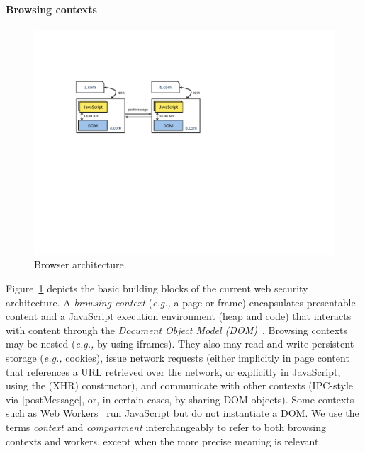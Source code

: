 \paragraph{Browsing contexts}
\iffigures
\begin{figure}
\begin{center}
\includegraphics[width=\columnwidth]{arch.pdf}
\end{center}
\vspace{-10pt}
\caption{\label{fig:primer-browser-arch} Browser
architecture.}
\vspace{-5pt}
\end{figure}
Figure~\ref{fig:primer-browser-arch} depicts the basic building blocks of
the current web security architecture.
%
%
A \emph{browsing context} (\emph{e.g.,} a page or frame) encapsulates
presentable content and a JavaScript execution environment (heap and
code) that interacts with content through the \emph{Document Object
  Model (DOM)}~\cite{html5}.
%
Browsing contexts may be nested (\emph{e.g.,} by using iframes).
%
They also may read and write persistent storage (\emph{e.g.,} cookies), issue
network requests (either implicitly in page content that references a
URL retrieved over the network, or explicitly in JavaScript, using the
\xhr{} (XHR) constructor), and communicate with other contexts
(IPC-style via \js|postMessage|, or, in certain cases, by sharing
DOM objects).
%
Some contexts such as Web Workers~\cite{workers} run JavaScript but do not instantiate a
DOM. We use the terms \emph{context} and \emph{compartment}
interchangeably to refer to both browsing contexts and workers, except when
the more precise meaning is relevant.

